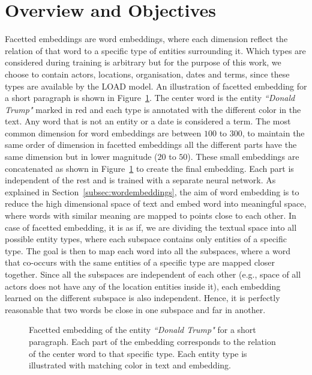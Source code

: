 \section{Overview and Objectives}\label{sec:facetted_overview}
Facetted embeddings are word embeddings, where each dimension reflect the relation of that word to a specific type of entities surrounding it. Which types are considered during training is arbitrary but for the purpose of this work, we choose to contain actors, locations, organisation, dates and terms, since these types are available by the LOAD model. An illustration of facetted embedding for a short paragraph is shown in Figure~\ref{fig:facetted_emb}. The center word is the entity \emph{``Donald Trump"} marked in red and each type is annotated with the different color in the text. Any word that is not an entity or a date is considered a term. The most common dimension for word embeddings are between $100$ to $300$, to maintain the same order of dimension in facetted embeddings all the different parts have the same dimension but in lower magnitude ($20$ to $50$). These small embeddings are concatenated as shown in Figure~\ref{fig:facetted_emb} to create the final embedding. Each part is independent of the rest and is trained with a separate neural network. As explained in Section~\ref{subsec:wordembeddings}, the aim of word embedding is to reduce the high dimensional space of text and embed word into meaningful space, where words with similar meaning are mapped to points close to each other. In case of facetted embedding, it is as if, we are dividing the textual space into all possible entity types, where each subspace contains only entities of a specific type. The goal is then to map each word into all the subspaces, where a word that co-occurs with the same entities of a specific type are mapped closer together. Since all the subspaces are independent of each other (e.g., space of all actors does not have any of the location entities inside it), each embedding learned on the different subspace is also independent. Hence, it is perfectly reasonable that two words be close in one subspace and far in another. \\
\begin{figure}
\centering 
\resizebox{0.97\textwidth}{0.3\textwidth}{      

}
\caption{Facetted embedding of  the entity \emph{``Donald Trump"} for a short paragraph. Each part of the embedding corresponds to the relation of the center word to that specific type. Each entity type is illustrated with matching color in text and embedding. }
\label{fig:facetted_emb}
\end{figure}
